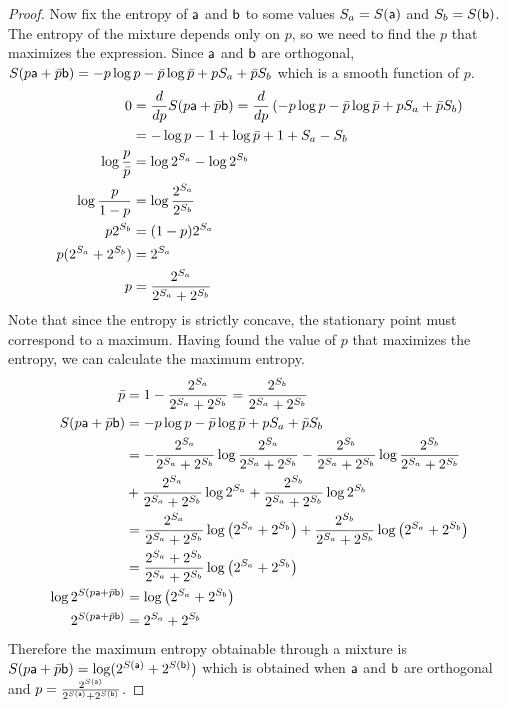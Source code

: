 \begin{mathSection}
\begin{proof}
	Now fix the entropy of $\ens[a]$ and $\ens[b]$ to some values $S_a = S(\ens[a])$ and $S_b = S(\ens[b])$. The entropy of the mixture depends only on $p$, so we need to find the $p$ that maximizes the expression. Since $\ens[a]$ and $\ens[b]$ are orthogonal, $S(p \ens[a] + \bar{p}\ens[b]) =  - p \log p - \bar{p} \log \bar{p} + p S_a + \bar{p} S_b$ which is a smooth function of $p$.
	\begin{equation}
		\begin{aligned}
			0 &= \frac{d}{dp} S(p \ens[a] + \bar{p}\ens[b]) =\frac{d}{dp} \left( - p \log p - \bar{p} \log \bar{p} + p S_a + \bar{p} S_b \right) \\
			&= - \log p - 1 + \log \bar{p} + 1 + S_a - S_b \\
			\log \frac{p}{\bar{p}} &= \log 2^{S_a} - \log 2^{S_b} \\
			\log \frac{p}{1-p} &= \log \frac{2^{S_a}}{2^{S_b}}  \\
			p 2^{S_b} &= (1-p) 2^{S_a}  \\
			p (2^{S_a} + 2^{S_b}) &= 2^{S_a}  \\
			p &= \frac{2^{S_a}}{2^{S_a} + 2^{S_b}}  \\
		\end{aligned}
	\end{equation}
	Note that since the entropy is strictly concave, the stationary point must correspond to a maximum. Having found the value of $p$ that maximizes the entropy, we can calculate the maximum entropy.
	\begin{equation}
		\begin{aligned}
			\bar{p} &= 1- \frac{2^{S_a}}{2^{S_a} + 2^{S_b}} = \frac{2^{S_b}}{2^{S_a} + 2^{S_b}} \\
			S(p \ens[a] + \bar{p}\ens[b]) &= - p \log p - \bar{p} \log \bar{p} + p S_a + \bar{p} S_b  \\
			&= - \frac{2^{S_a}}{2^{S_a} + 2^{S_b}} \log \frac{2^{S_a}}{2^{S_a} + 2^{S_b}} - \frac{2^{S_b}}{2^{S_a} + 2^{S_b}} \log \frac{2^{S_b}}{2^{S_a} + 2^{S_b}} \\
			&+ \frac{2^{S_a}}{2^{S_a} + 2^{S_b}} \log 2^{S_a} + \frac{2^{S_b}}{2^{S_a} + 2^{S_b}} \log 2^{S_b} \\
			&= \frac{2^{S_a}}{2^{S_a} + 2^{S_b}} \log \left( 2^{S_a} + 2^{S_b} \right) + \frac{2^{S_b}}{2^{S_a} + 2^{S_b}} \log \left( 2^{S_a} + 2^{S_b} \right) \\
			&= \frac{2^{S_a} + 2^{S_b}}{2^{S_a} + 2^{S_b}} \log \left( 2^{S_a} + 2^{S_b} \right) \\
			\log 2^{S(p \ens[a] + \bar{p}\ens[b])} &= \log \left( 2^{S_a} + 2^{S_b} \right) \\
			2^{S(p \ens[a] + \bar{p}\ens[b])} &=  2^{S_a} + 2^{S_b}  \\
		\end{aligned}
	\end{equation}
	Therefore the maximum entropy obtainable through a mixture is $S(p \ens[a] + \bar{p}\ens[b]) = \log (2^{S(\ens[a])} + 2^{S(\ens[b])})$ which is obtained when $\ens[a]$ and $\ens[b]$ are orthogonal and $p = \frac{2^{S(\ens[a])}}{2^{S(\ens[a])} + 2^{S(\ens[b])}}$.
\end{proof}


\end{mathSection}
